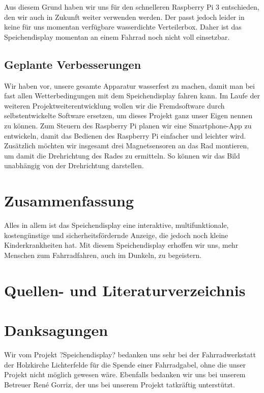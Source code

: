 \documentclass [a4paper, 11pt] {article}
\begin{document}
Aus diesem Grund haben wir uns für den schnelleren Raspberry Pi 3 entschieden, den wir auch in Zukunft weiter verwenden werden. Der passt jedoch leider in keine für uns momentan verfügbare wasserdichte Verteilerbox. Daher ist das Speichendisplay momentan an einem Fahrrad noch nicht voll einsetzbar.
\subsection{Geplante Verbesserungen}
Wir haben vor, unsere gesamte Apparatur wasserfest zu machen, damit man bei fast allen Wetterbedingungen mit dem Speichendisplay fahren kann. Im Laufe der weiteren Projektweiterentwicklung wollen wir die Fremdsoftware durch selbstentwickelte Software ersetzen, um dieses Projekt ganz unser Eigen nennen zu können. Zum Steuern des Raspberry Pi planen wir eine Smartphone-App zu entwickeln, damit das Bedienen des Raspberry Pi einfacher und leichter wird. Zusätzlich möchten wir insgesamt drei Magnetsensoren an das Rad montieren, um damit die Drehrichtung des Rades zu ermitteln. So können wir das Bild unabhängig von der Drehrichtung darstellen.
\section{Zusammenfassung}
Alles in allem ist das Speichendisplay eine interaktive, multifunktionale, kostengünstige und sicherheitsfördernde Anzeige, die jedoch noch kleine Kinderkrankheiten hat. Mit diesem Speichendisplay erhoffen wir uns, mehr Menschen zum Fahrradfahren, auch im Dunkeln, zu begeistern.
\section{Quellen- und Literaturverzeichnis}
\section{Danksagungen}
Wir vom Projekt ?Speichendisplay? bedanken uns sehr bei der Fahrradwerkstatt der Holzkirche Lichterfelde für die Spende einer Fahrradgabel, ohne die unser Projekt nicht möglich gewesen wäre. Ebenfalls bedanken wir uns bei unserem Betreuer René Gorriz, der uns bei unserem Projekt tatkräftig unterstützt.
\end{document}
